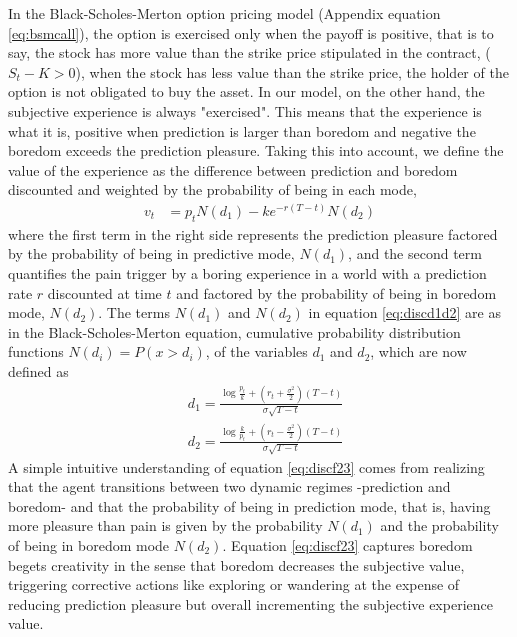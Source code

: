 \documentclass[11pt, onecolumn]{article}
\begin{document}
In the Black-Scholes-Merton option pricing model (Appendix equation \ref{eq:bsmcall}), the option is exercised only when the payoff is positive, that is to say, the stock  has more value than the strike price stipulated in the contract, ($S_t - K >0 $), when the stock has less value than the strike price, the holder of the option is not obligated to buy the asset. In our model, on the other hand, the subjective experience is always "exercised". This means that the experience is what it is, positive when prediction is larger than boredom and negative the boredom exceeds the prediction pleasure. Taking this into account, we define the value of the experience as the difference between prediction and boredom discounted and weighted by the probability of being in each mode,
\begin{equation}
\begin{split}
    v_t  & =  p_{t}N(d_1) - k e^{-r(T-t)}N(d_2)
\end{split}
\label{eq:discf23}
\end{equation}
where the first term in the right side represents the prediction pleasure  factored by the probability of being in predictive mode, $N(d_1)$, and the second term quantifies the pain trigger by a boring experience in a world with a prediction rate $r$ discounted at time $t$ and factored by the probability of being in boredom mode, $N(d_2)$. The terms $N(d_1)$ and $N(d_2)$ in equation \ref{eq:discd1d2} are as in the Black-Scholes-Merton equation, cumulative probability distribution functions
$N(d_i) = P(x > d_i)$, of the variables $d_1$ and $d_2$, which are now defined as 
\begin{equation}
\begin{split}
    & d_1 = \frac{\log \frac{p_t}{k}  + (r_t + \frac{\sigma ^2}{2})(T-t)}{\sigma \sqrt{T-t}}  \\
    & d_2 = \frac{\log \frac{k}{p_t}  + (r_t - \frac{\sigma ^2}{2})(T-t)}{\sigma \sqrt{T-t}} 
\end{split}
\label{eq:discd1d2}
\end{equation}
A simple intuitive understanding of equation \ref{eq:discf23} comes from realizing that the agent transitions between two dynamic regimes -prediction and boredom- and that the probability of being in prediction mode, that is, having more pleasure than pain is given by the probability $N(d_1)$ and the probability of being in boredom mode $N(d_2)$. Equation \ref{eq:discf23} captures boredom begets creativity in the sense that boredom decreases the subjective value, triggering corrective actions like exploring or wandering at the expense of reducing prediction pleasure but overall incrementing the subjective experience value.
\end{document}
